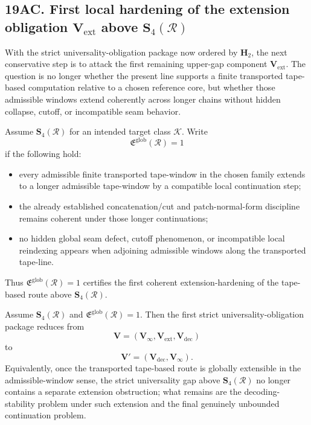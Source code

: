 \subsection*{19AC. First local hardening of the extension obligation \(\mathbf V_{\mathrm{ext}}\) above \(\mathbf S_4(\mathcal R)\)}
With the strict universality-obligation package now ordered by \(\mathbf H_2\), the next conservative step is to attack the first remaining upper-gap component \(\mathbf V_{\mathrm{ext}}\). The question is no longer whether the present line supports a finite transported tape-based computation relative to a chosen reference core, but whether those admissible windows extend coherently across longer chains without hidden collapse, cutoff, or incompatible seam behavior.

\begin{definition}
Assume \(\mathbf S_4(\mathcal R)\) for an intended target class \(\mathcal K\).
Write
\[
\mathfrak E^{\mathrm{glob}}(\mathcal R)=1
\]
if the following hold:
\begin{itemize}[leftmargin=2em]
  \item every admissible finite transported tape-window in the chosen family extends to a longer admissible tape-window by a compatible local continuation step;
  \item the already established concatenation/cut and patch-normal-form discipline remains coherent under those longer continuations;
  \item no hidden global seam defect, cutoff phenomenon, or incompatible local reindexing appears when adjoining admissible windows along the transported tape-line.
\end{itemize}
Thus \(\mathfrak E^{\mathrm{glob}}(\mathcal R)=1\) certifies the first coherent extension-hardening of the tape-based route above \(\mathbf S_4(\mathcal R)\).
\end{definition}

\begin{proposition}
Assume \(\mathbf S_4(\mathcal R)\) and \(\mathfrak E^{\mathrm{glob}}(\mathcal R)=1\). Then the first strict universality-obligation package reduces from
\[
\mathbf V=(\mathbf V_\infty,\mathbf V_{\mathrm{ext}},\mathbf V_{\mathrm{dec}})
\]
to
\[
\mathbf V'=(\mathbf V_{\mathrm{dec}},\mathbf V_\infty).
\]
Equivalently, once the transported tape-based route is globally extensible in the admissible-window sense, the strict universality gap above \(\mathbf S_4(\mathcal R)\) no longer contains a separate extension obstruction; what remains are the decoding-stability problem under such extension and the final genuinely unbounded continuation problem.
\end{proposition}

